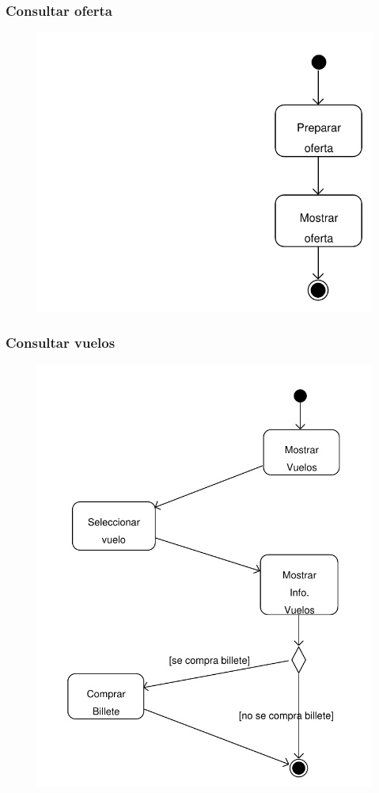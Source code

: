 \documentclass[11pt, a4paper, twoside, titlepage]{article}
\begin{document}
			\subsubsection{Consultar oferta}
				\begin{figure}[H]\centering
					\includegraphics[scale=.7]{diagramas/da_consultaroferta.pdf}
				\end{figure}

			\subsubsection{Consultar vuelos}
				\begin{figure}[H]\centering
					\includegraphics[scale=.71]{diagramas/da_consultarvuelos.pdf}
				\end{figure}
			
\end{document}
